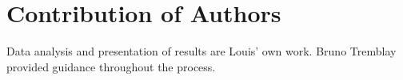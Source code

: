 \section*{Contribution of Authors}


Data analysis and presentation of results are Louis' own work. Bruno Tremblay provided guidance throughout the process.